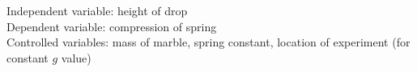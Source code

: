 Independent variable: height of drop \\
Dependent variable: compression of spring \\ 
Controlled variables: mass of marble, spring constant, location of experiment (for constant $g$ value)